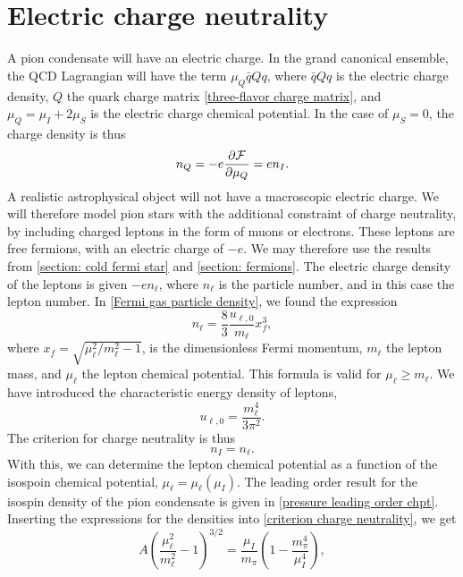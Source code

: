 \section{Electric charge neutrality}


A pion condensate will have an electric charge.
In the grand canonical ensemble, the QCD Lagrangian will have the term  $\mu_Q \bar q Q q$, where $\bar q Q q$ is the electric charge density, $Q$ the quark charge matrix \autoref{three-flavor charge matrix}, and $\mu_Q = \mu_I + 2 \mu_S$ is the electric charge chemical potential.
In the case of $\mu_S = 0$, the charge density is thus
%
\begin{equation}
    n_Q = - e \pdv{\mathcal{F}}{\mu_Q} = e n_I.
\end{equation}
%
A realistic astrophysical object will not have a macroscopic electric charge.
We will therefore model pion stars with the additional constraint of charge neutrality, by including charged leptons in the form of muons or electrons.
These leptons are free fermions, with an electric charge of $- e$.
We may therefore use the results from \autoref{section: cold fermi star} and \autoref{section: fermions}.
The electric charge density of the leptons is given $- e n_\ell$, where $n_\ell$ is the particle number, and in this case the lepton number.
In \autoref{Fermi gas particle density}, we found the expression
%
\begin{equation}
    n_{\ell} = \frac{8}{3} 
    \frac{u_{\ell, 0}}{m_\ell} x_f^3,
\end{equation}
%
where $x_f = \sqrt{ {\mu_\ell^2}/{m_\ell^2} - 1}$, is the dimensionless Fermi momentum, $m_\ell$ the lepton mass, and $\mu_\ell$ the lepton chemical potential.
This formula is valid for $\mu_\ell \geq m_\ell$.
We have introduced the characteristic energy density of leptons,
%
\begin{equation}
    u_{\ell, 0} = \frac{m^4_\ell}{3 \pi^2}.
\end{equation}
%
The criterion for charge neutrality is thus
%
\begin{equation}
    \label{criterion charge neutrality}
    n_I = n_\ell.
\end{equation}
%
With this, we can determine the lepton chemical potential as a function of the isospoin chemical potential, $\mu_\ell = \mu_\ell(\mu_I)$.
The leading order result for the isospin density of the pion condensate is given in \autoref{pressure leading order chpt}.
Inserting the expressions for the densities into \autoref{criterion charge neutrality}, we get
%
\begin{equation}
    \label{equation mu ell mu I}
    A \left(\frac{\mu_\ell^2 }{m_\ell^2} - 1 \right)^{3/2}
    = \frac{\mu_I}{m_\pi}\left( 1 - \frac{m_\pi^4}{\mu_I^4}  \right),
\end{equation}
